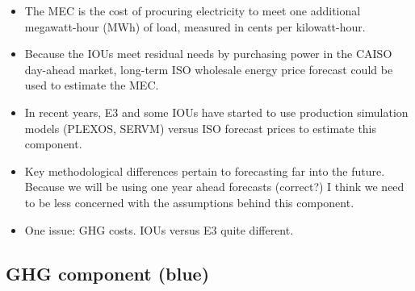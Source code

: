 \documentclass[11pt]{article}
\begin{document}
\begin{itemize}


\item The MEC is the cost of procuring electricity to meet one additional megawatt-hour (MWh) of load, measured in cents per kilowatt-hour. 

\item Because the IOUs meet residual needs by purchasing power in the CAISO day-ahead market, long-term ISO wholesale energy price forecast could be used to estimate the MEC.

\item In recent years, E3 and some IOUs have started to use production simulation models (PLEXOS, SERVM) versus ISO forecast prices to estimate this component. 

\item Key methodological differences pertain to forecasting far into the future. Because we will be using one year ahead forecasts (correct?) I think we need to be less concerned with the assumptions behind this component.

\item One issue: GHG costs. IOUs versus E3 quite different.

\end{itemize}


\subsection{GHG component (blue)}
\end{document}
